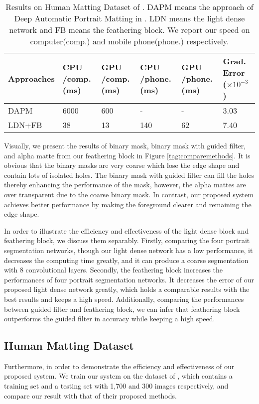 \documentclass[sigconf]{acmart}
\begin{document}
\begin{table}
\caption{Results on Human Matting Dataset of \cite{shen2016deep}. DAPM means the approach of Deep Automatic Portrait Matting in \cite{shen2016deep}. LDN means the light dense network and FB means the feathering block. We report our speed on computer(comp.) and mobile phone(phone.) respectively.}
\begin{tabular}{p{1.4cm}p{1cm}p{1cm}p{1cm}p{1cm}p{1.2cm}}
\toprule
Approaches &CPU /comp. (ms) &GPU /comp. (ms) &CPU /phone. (ms) &GPU /phone. (ms) &Grad. Error ($\times 10^{-3}$) \\ \midrule
DAPM & 6000 & 600 &- &- & 3.03 \\
LDN+FB & 38 & 13 &140 &62 & 7.40 \\
\bottomrule
\end{tabular}\label{tab:humandata}
\end{table}
Visually, we present the results of binary mask, binary mask with guided filter, and alpha matte from our feathering block in Figure \ref{tag:comparemethods}. It is obvious that the binary masks are very coarse which lose the edge shape and contain lots of isolated holes. The binary mask with guided filter can fill the holes thereby enhancing the performance of the mask, however, the alpha mattes are over transparent due to the coarse binary mask. In contrast, our proposed system achieves better performance by making the foreground clearer and remaining the edge shape.

In order to illustrate the efficiency and effectiveness of the light dense block and feathering block, we discuss them separably. Firstly, comparing the four portrait segmentation networks, though our light dense network has a low performance, it decreases the computing time greatly, and it can produce a coarse segmentation with 8 convolutional layers. Secondly, the feathering block increases the performances of four portrait segmentation networks. It decreases the error of our proposed light dense network greatly, which holds a comparable results with the best results and keeps a high speed. Additionally, comparing the performances between guided filter and feathering block, we can infer that feathering block outperforms the guided filter in accuracy while keeping a high speed.

\subsection{Human Matting Dataset}
Furthermore, in order to demonstrate the efficiency and effectiveness of our proposed system. We train our system on the dataset of \cite{shen2016deep}, which contains a training set and a testing set with 1,700 and 300 images respectively, and compare our result with that of their proposed methods.
\end{document}
